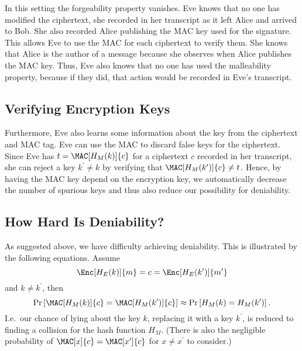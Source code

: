 In this setting the forgeability property vanishes.
Eve knows that no one has modified the ciphertext, she recorded in her 
transcript as it left Alice and arrived to Bob.
She also recorded Alice publishing the \ac{MAC} key used for the signature.
This allows Eve to use the \ac{MAC} for each ciphertext to verify them.
She knows that Alice is the author of a message because she observes when Alice 
publishes the \ac{MAC} key.
Thus, Eve also knows that no one has used the malleability property, because if 
they did, that action would be recorded in Eve's transcript.

\subsection{Verifying Encryption Keys}
\label{VerifyingKeys}

Furthermore, Eve also learns some information about the key from the ciphertext 
and \ac{MAC} tag.
Eve can use the \ac{MAC} to discard false keys for the ciphertext.
Since Eve has \(t = \MAC[H_M( k )]{ c }\) for a ciphertext \(c\) recorded in 
her transcript, she can reject a key \(k^\prime\neq k\) by verifying that
\(\MAC[H_M( k^\prime )]{ c } \neq t\).
Hence, by having the \ac{MAC} key depend on the encryption key, we 
automatically decrease the number of spurious keys and thus also reduce our 
possibility for deniability.

\subsection{How Hard Is Deniability?}
\label{HardnessOfDeniability}

As suggested above, we have difficulty achieving deniability.
This is illustrated by the following equations.
Assume
\begin{equation*}
  \Enc[H_E(k)]{m} = c = \Enc[H_E(k^\prime)]{m^\prime}
\end{equation*}
and \(k\neq k^\prime\), then
\begin{equation*}
  \Pr\left[
    \MAC[H_M(k)]{c} = \MAC[H_M(k^\prime)]{c}
  \right]
  \approx
  \Pr\left[ H_M(k) = H_M(k^\prime) \right].
\end{equation*}
I.e.~our chance of lying about the key \(k\), replacing it with a key 
\(k^\prime\), is reduced to finding a collision for the hash function \(H_M\).
(There is also the negligible probability of \(\MAC[x]{c} = \MAC[x^\prime]{c}\) 
for \(x\neq x^\prime\) to consider.)

